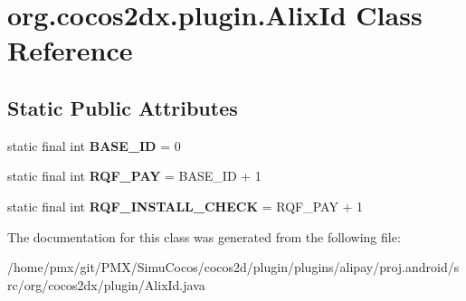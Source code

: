 \hypertarget{classorg_1_1cocos2dx_1_1plugin_1_1AlixId}{}\section{org.\+cocos2dx.\+plugin.\+Alix\+Id Class Reference}
\label{classorg_1_1cocos2dx_1_1plugin_1_1AlixId}
\subsection*{Static Public Attributes}
\begin{DoxyCompactItemize}
\item 
\mbox{\label{classorg_1_1cocos2dx_1_1plugin_1_1AlixId_a1784cd8c3159519d1584eecc963d2956}} 
static final int {\bfseries B\+A\+S\+E\+\_\+\+ID} = 0
\item 
\mbox{\label{classorg_1_1cocos2dx_1_1plugin_1_1AlixId_ae0d0a53e64f997c51dc2d0b8b0285a2d}} 
static final int {\bfseries R\+Q\+F\+\_\+\+P\+AY} = B\+A\+S\+E\+\_\+\+ID + 1
\item 
\mbox{\label{classorg_1_1cocos2dx_1_1plugin_1_1AlixId_af3aaefd62331c6064f2c36dbd388bca4}} 
static final int {\bfseries R\+Q\+F\+\_\+\+I\+N\+S\+T\+A\+L\+L\+\_\+\+C\+H\+E\+CK} = R\+Q\+F\+\_\+\+P\+AY + 1
\end{DoxyCompactItemize}


The documentation for this class was generated from the following file\+:\begin{DoxyCompactItemize}
\item 
/home/pmx/git/\+P\+M\+X/\+Simu\+Cocos/cocos2d/plugin/plugins/alipay/proj.\+android/src/org/cocos2dx/plugin/Alix\+Id.\+java\end{DoxyCompactItemize}
